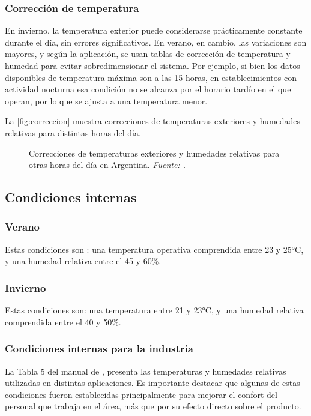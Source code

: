 \subsubsection{Corrección de temperatura}

En invierno, la temperatura exterior puede considerarse prácticamente constante durante el día, sin errores significativos. En verano, en cambio, las variaciones son mayores, y según la aplicación, se usan tablas de corrección de temperatura y humedad para evitar sobredimensionar el sistema. Por ejemplo, si bien los datos disponibles de temperatura máxima son a las 15 horas, en establecimientos con actividad nocturna  esa condición no se alcanza por el horario tardío en el que operan, por lo que se ajusta a una temperatura menor.

La \autoref{fig:correccion} muestra correcciones de temperaturas exteriores y humedades relativas para distintas horas del día.

\begin{figure}
	\centering
	\caption{Correcciones de temperaturas exteriores y humedades relativas para otras horas del día en Argentina. \emph{Fuente: \textcite[Cuadro 8-I]{quadri2020}.}}
	\label{fig:correccion}
\end{figure}

\subsection{Condiciones internas}

\subsubsection{Verano}
Estas condiciones son \parencite{carrier2009}: una temperatura operativa comprendida entre 23 y 25°C, y una humedad relativa entre el 45 y 60\%.

\subsubsection{Invierno}
Estas condiciones son: una temperatura entre 21 y 23°C, y una humedad relativa comprendida entre el 40 y 50\%.

\subsubsection{Condiciones internas para la industria}
La Tabla 5 del manual de \citeauthor[pág. I-12]{carrier2009}, presenta las temperaturas y humedades relativas utilizadas en distintas aplicaciones. Es importante destacar que algunas de estas condiciones fueron establecidas principalmente para mejorar el confort del personal que trabaja en el área, más que por su efecto directo sobre el producto.